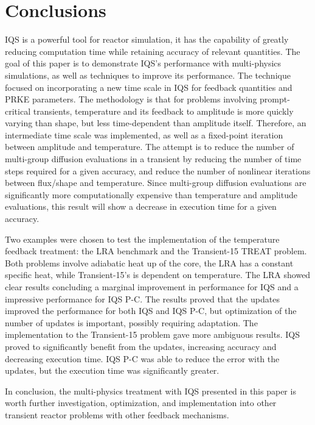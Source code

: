 \documentclass{anstrans}
\begin{document}
\section{Conclusions}

IQS is a powerful tool for reactor simulation, it has the capability of greatly reducing computation time while retaining accuracy of relevant quantities.  The goal of this paper is to demonstrate IQS's performance with multi-physics simulations, as well as techniques to improve its performance.  The technique focused on incorporating a new time scale in IQS for feedback quantities and PRKE parameters. The methodology is that for problems involving prompt-critical transients, temperature and its feedback to amplitude is more quickly varying than shape, but less time-dependent than amplitude itself.  Therefore, an intermediate time scale was implemented, as well as a fixed-point iteration between amplitude and temperature.  The attempt is to reduce the number of multi-group diffusion evaluations in a transient by reducing the number of time steps required for a given accuracy, and reduce the number of nonlinear iterations between flux/shape and temperature.  Since multi-group diffusion evaluations are significantly more computationally expensive than temperature and amplitude evaluations, this result will show a decrease in execution time for a given accuracy.

Two examples were chosen to test the implementation of the temperature feedback treatment: the LRA benchmark and the Transient-15 TREAT problem.  Both problems involve adiabatic heat up of the core, the LRA has a constant specific heat, while Transient-15's is dependent on temperature.  The LRA showed clear results concluding a marginal improvement in performance for IQS and a impressive performance for IQS P-C.  The results proved that the updates improved the performance for both IQS and IQS P-C, but optimization of the number of updates is important, possibly requiring adaptation.  The implementation to the Transient-15 problem gave more ambiguous results.  IQS proved to significantly benefit from the updates, increasing accuracy and decreasing execution time.  IQS P-C was able to reduce the error with the updates, but the execution time was significantly greater.

In conclusion, the multi-physics treatment with IQS presented in this paper is worth further investigation, optimization, and implementation into other transient reactor problems with other feedback mechanisms.   
\end{document}
